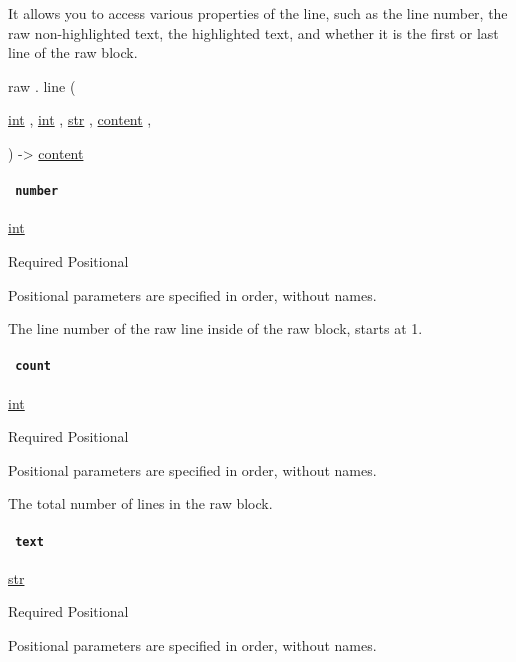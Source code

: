 It allows you to access various properties of the line, such as the line
number, the raw non-highlighted text, the highlighted text, and whether
it is the first or last line of the raw block.

raw { . } { line } (

{ \href{/docs/reference/foundations/int/}{int} , } {
\href{/docs/reference/foundations/int/}{int} , } {
\href{/docs/reference/foundations/str/}{str} , } {
\href{/docs/reference/foundations/content/}{content} , }

) -\textgreater{} \href{/docs/reference/foundations/content/}{content}

\paragraph{\texorpdfstring{\texttt{\ number\ }}{ number }}\label{definitions-line-number}

\href{/docs/reference/foundations/int/}{int}

{Required} {{ Positional }}

\label{definitions-line-number-positional-tooltip}
Positional parameters are specified in order, without names.

The line number of the raw line inside of the raw block, starts at 1.

\paragraph{\texorpdfstring{\texttt{\ count\ }}{ count }}\label{definitions-line-count}

\href{/docs/reference/foundations/int/}{int}

{Required} {{ Positional }}

\label{definitions-line-count-positional-tooltip}
Positional parameters are specified in order, without names.

The total number of lines in the raw block.

\paragraph{\texorpdfstring{\texttt{\ text\ }}{ text }}\label{definitions-line-text}

\href{/docs/reference/foundations/str/}{str}

{Required} {{ Positional }}

\label{definitions-line-text-positional-tooltip}
Positional parameters are specified in order, without names.

